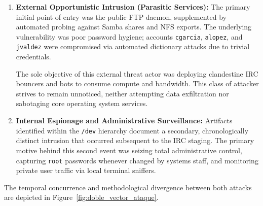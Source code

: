\begin{enumerate}
    \item \textbf{External Opportunistic Intrusion (Parasitic Services):}
    The primary initial point of entry was the public FTP daemon, supplemented by automated probing against Samba shares and NFS exports. The underlying vulnerability was poor password hygiene; accounts \texttt{cgarcia}, \texttt{alopez}, and \texttt{jvaldez} were compromised via automated dictionary attacks due to trivial credentials.
    
    The sole objective of this external threat actor was deploying clandestine IRC bouncers and bots to consume compute and bandwidth. This class of attacker strives to remain unnoticed, neither attempting data exfiltration nor sabotaging core operating system services.

    \item \textbf{Internal Espionage and Administrative Surveillance:}
    Artifacts identified within the \texttt{/dev} hierarchy document a secondary, chronologically distinct intrusion that occurred subsequent to the IRC staging. The primary motive behind this second event was seizing total administrative control, capturing \texttt{root} passwords whenever changed by systems staff, and monitoring private user traffic via local terminal sniffers.
\end{enumerate}

The temporal concurrence and methodological divergence between both attacks are depicted in Figure~\ref{fig:doble_vector_ataque}.


